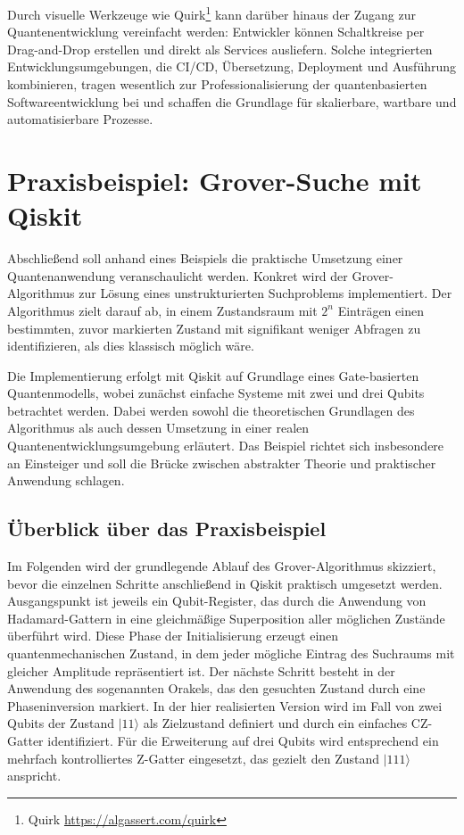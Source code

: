 Durch visuelle Werkzeuge wie Quirk\footnote{Quirk \url{https://algassert.com/quirk}} kann darüber hinaus der Zugang zur Quantenentwicklung vereinfacht werden: Entwickler können Schaltkreise per Drag-and-Drop erstellen und direkt als Services ausliefern. Solche integrierten Entwicklungsumgebungen, die CI/CD, Übersetzung, Deployment und Ausführung kombinieren, tragen wesentlich zur Professionalisierung der quantenbasierten Softwareentwicklung bei und schaffen die Grundlage für skalierbare, wartbare und automatisierbare Prozesse. \autocite{romero-alvarez_qcraft_2025}

\section{Praxisbeispiel: Grover-Suche mit Qiskit}
\label{sec:practical-example}

Abschließend soll anhand eines Beispiels die praktische Umsetzung einer Quantenanwendung veranschaulicht werden. Konkret wird der Grover-Algorithmus zur Lösung eines unstrukturierten Suchproblems implementiert. Der Algorithmus zielt darauf ab, in einem Zustandsraum mit $2^n$ Einträgen einen bestimmten, zuvor markierten Zustand mit signifikant weniger Abfragen zu identifizieren, als dies klassisch möglich wäre.

Die Implementierung erfolgt mit Qiskit auf Grundlage eines Gate-basierten Quantenmodells, wobei zunächst einfache Systeme mit zwei und drei Qubits betrachtet werden. Dabei werden sowohl die theoretischen Grundlagen des Algorithmus als auch dessen Umsetzung in einer realen Quantenentwicklungsumgebung erläutert. Das Beispiel richtet sich insbesondere an Einsteiger und soll die Brücke zwischen abstrakter Theorie und praktischer Anwendung schlagen.

\subsection{Überblick über das Praxisbeispiel}

Im Folgenden wird der grundlegende Ablauf des Grover-Algorithmus skizziert, bevor die einzelnen Schritte anschließend in Qiskit praktisch umgesetzt werden. Ausgangspunkt ist jeweils ein Qubit-Register, das durch die Anwendung von Hadamard-Gattern in eine gleichmäßige Superposition aller möglichen Zustände überführt wird. Diese Phase der Initialisierung erzeugt einen quantenmechanischen Zustand, in dem jeder mögliche Eintrag des Suchraums mit gleicher Amplitude repräsentiert ist. Der nächste Schritt besteht in der Anwendung des sogenannten Orakels, das den gesuchten Zustand durch eine Phaseninversion markiert. In der hier realisierten Version wird im Fall von zwei Qubits der Zustand $|11\rangle$ als Zielzustand definiert und durch ein einfaches CZ-Gatter identifiziert. Für die Erweiterung auf drei Qubits wird entsprechend ein mehrfach kontrolliertes Z-Gatter eingesetzt, das gezielt den Zustand $|111\rangle$ anspricht.


